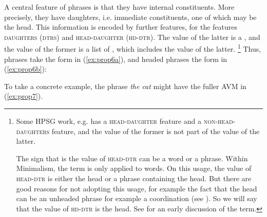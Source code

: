 \documentclass[output=paper
	        ,collection
	        ,collectionchapter
 	        ,biblatex
                ,babelshorthands
                ,newtxmath
                ,draftmode
                ,colorlinks, citecolor=brown
]{langscibook}
\begin{document}
A central feature of phrases is that they have internal constituents. More precisely, they have daughters, i.e. immediate constituents, one of which may be the head. This information is encoded by further features, for \citet[29]{GSag2000a-u} the features \textsc{daughters} (\textsc{dtrs}) and \textsc{head-daughter} (\textsc{hd-dtr}). The value of the latter is a , and the value of the former is a list of , which includes the value of the latter.%
%
\footnote{Some HPSG work, e.g. \citet{Sag97a} has a \textsc{head-daughter} feature and a \textsc{non-head-daughters} feature, and the value of the former is not part of the value of the latter. 

The sign that is the value of \textsc{head-dtr} can be a word or a phrase. Within Minimalism, the term  is only applied to words. On this usage, the value of \textsc{head-dtr} is either the head or a phrase containing the head. But there are good reasons for not adopting this usage, for example the fact that the head can be an unheaded phrase for example a coordination (see ). So we will say that the value of \textsc{hd-dtr} is the head. See \citet[30]{Jackendoff77a} for an early discussion of the term.}
%
Thus, phrases take the form in (\ref{ex:prop6a}), and headed phrases the form in (\ref{ex:prop6b}):

\begin{multicols}{2}
\eal\label{ex:prop6}
\ex\label{ex:prop6a}

\columnbreak
\ex\label{ex:prop6b}
\zl
\end{multicols}
%
To take a concrete example, the phrase \emph{the cat} might have the fuller AVM in (\ref{ex:prop7}).


\ea\label{ex:prop7}
\z
\end{document}
